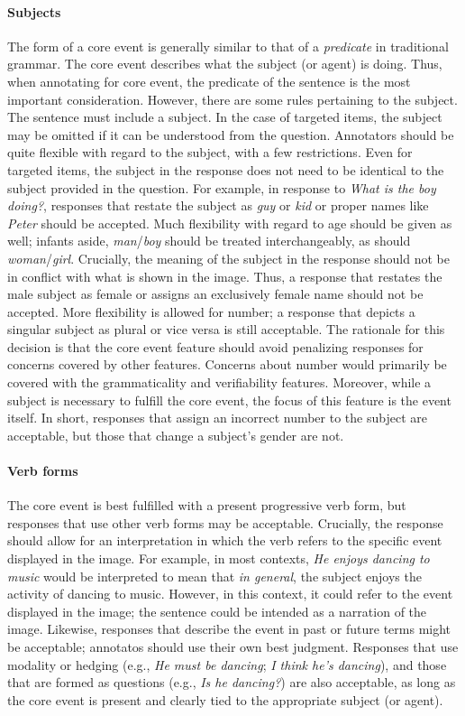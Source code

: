 \documentclass[12pt,notitlepage]{article}
\begin{document}
\paragraph{Subjects} \label{para:core-event-subjects} The form of a core event is generally similar to that of a \textit{predicate} in traditional grammar. The core event describes what the subject (or agent) is doing. Thus, when annotating for core event, the predicate of the sentence is the most important consideration. However, there are some rules pertaining to the subject. The sentence must include a subject. In the case of targeted items, the subject may be omitted if it can be understood from the question. Annotators should be quite flexible with regard to the subject, with a few restrictions. Even for targeted items, the subject in the response does not need to be identical to the subject provided in the question. For example, in response to \textit{What is the boy doing?}, responses that restate the subject as \textit{guy} or \textit{kid} or proper names like \textit{Peter} should be accepted. Much flexibility with regard to age should be given as well; infants aside, \textit{man}/\textit{boy} should be treated interchangeably, as should \textit{woman}/\textit{girl}. Crucially, the meaning of the subject in the response should not be in conflict with what is shown in the image. Thus, a response that restates the male subject as female or assigns an exclusively female name should not be accepted. More flexibility is allowed for number; a response that depicts a singular subject as plural or vice versa is still acceptable. The rationale for this decision is that the core event feature should avoid penalizing responses for concerns covered by other features. Concerns about number would primarily be covered with the grammaticality and verifiability features. Moreover, while a subject is necessary to fulfill the core event, the focus of this feature is the event itself. In short, responses that assign an incorrect number to the subject  are acceptable, but those that change a subject's gender are not.

\paragraph{Verb forms}
The core event is best fulfilled with a present progressive verb form, but responses that use other verb forms may be acceptable. Crucially, the response should allow for an interpretation in which the verb refers to the specific event displayed in the image. For example, in most contexts, \textit{He enjoys dancing to music} would be interpreted to mean that \textit{in general}, the subject enjoys the activity of dancing to music. However, in this context, it could refer to the event displayed in the image; the sentence could be intended as a narration of the image. Likewise, responses that describe the event in past or future terms might be acceptable; annotatos should use their own best judgment. Responses that use modality or hedging (e.g., \textit{He must be dancing}; \textit{I think he's dancing}), and those that are formed as questions (e.g., \textit{Is he dancing?}) are also acceptable, as long as the core event is present and clearly tied to the appropriate subject (or agent).
\end{document}
